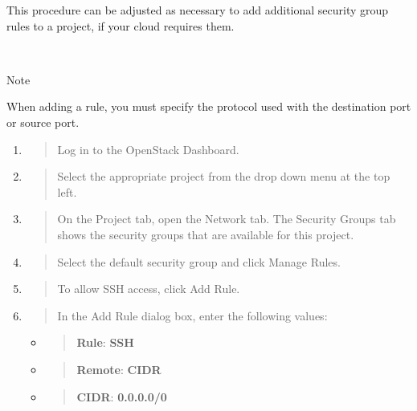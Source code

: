 This procedure can be adjusted as necessary to add additional security
group rules to a project, if your cloud requires them.

~

Note

When adding a rule, you must specify the protocol used with the
destination port or source port.

\begin{enumerate}
\def\labelenumi{\arabic{enumi}.}
\item
  \begin{quote}
  Log in to the \gls{OpenStack Dashboard}.
  \end{quote}
\item
  \begin{quote}
  Select the appropriate project from the drop down menu at the top
  left.
  \end{quote}
\item
  \begin{quote}
  On the Project tab, open the Network tab. The Security Groups tab
  shows the security groups that are available for this project.
  \end{quote}
\item
  \begin{quote}
  Select the default security group and click Manage Rules.
  \end{quote}
\item
  \begin{quote}
  To allow SSH access, click Add Rule.
  \end{quote}
\item
  \begin{quote}
  In the Add Rule dialog box, enter the following values:
  \end{quote}

  \begin{itemize}
  \item
    \begin{quote}
    \textbf{Rule}: \textbf{SSH}
    \end{quote}
  \item
    \begin{quote}
    \textbf{Remote}: \textbf{CIDR}
    \end{quote}
  \item
    \begin{quote}
    \textbf{CIDR}: \textbf{0.0.0.0/0}
    \end{quote}
  \end{itemize}
\end{enumerate}

